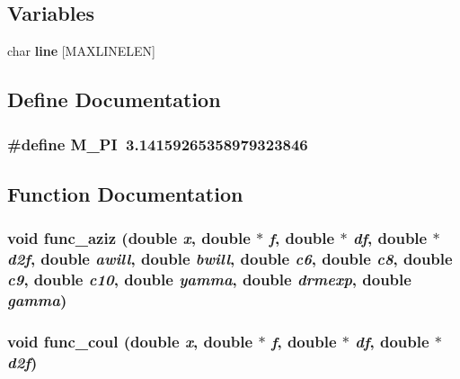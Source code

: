 \subsection*{Variables}
\begin{CompactItemize}
\item 
char {\bf line} [MAXLINELEN]
\end{CompactItemize}


\subsection{Define Documentation}
\subsubsection{\setlength{\rightskip}{0pt plus 5cm}\#define M\_\-PI~3.14159265358979323846}\label{energy_2inter_2md__funcvdw_8c_e71449b1cc6e6250b91f539153a7a0d3}




\subsection{Function Documentation}
\subsubsection{\setlength{\rightskip}{0pt plus 5cm}void func\_\-aziz (double {\em x}, double $\ast$ {\em f}, double $\ast$ {\em df}, double $\ast$ {\em d2f}, double {\em awill}, double {\em bwill}, double {\em c6}, double {\em c8}, double {\em c9}, double {\em c10}, double {\em yamma}, double {\em drmexp}, double {\em gamma})}\label{energy_2inter_2md__funcvdw_8c_64c66ef88f0a9d62bfc635112ed01b9f}


\subsubsection{\setlength{\rightskip}{0pt plus 5cm}void func\_\-coul (double {\em x}, double $\ast$ {\em f}, double $\ast$ {\em df}, double $\ast$ {\em d2f})}\label{energy_2inter_2md__funcvdw_8c_ea71c8b471297028f0aa05c24a0a539d}


